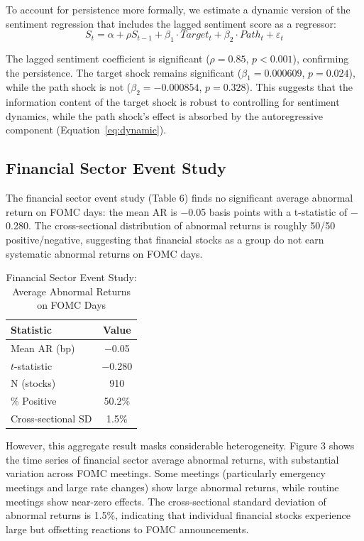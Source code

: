 \documentclass[12pt]{article}
\begin{document}
To account for persistence more formally, we estimate a dynamic version of the sentiment regression that includes the lagged sentiment score as a regressor:
\begin{equation}
\label{eq:dynamic}
S_t = \alpha + \rho S_{t-1} + \beta_1 \cdot Target_t + \beta_2 \cdot Path_t + \varepsilon_t
\end{equation}

The lagged sentiment coefficient is significant ($\rho = 0.85$, $p < 0.001$), confirming the persistence. The target shock remains significant ($\beta_1 = 0.000609$, $p = 0.024$), while the path shock is not ($\beta_2 = -0.000854$, $p = 0.328$). This suggests that the information content of the target shock is robust to controlling for sentiment dynamics, while the path shock's effect is absorbed by the autoregressive component (Equation~\eqref{eq:dynamic}).

\subsection{Financial Sector Event Study}

The financial sector event study (Table 6) finds no significant average abnormal return on FOMC days: the mean AR is $-$0.05 basis points with a t-statistic of $-$0.280. The cross-sectional distribution of abnormal returns is roughly 50/50 positive/negative, suggesting that financial stocks as a group do not earn systematic abnormal returns on FOMC days.


\begin{table}[htbp]\centering\caption{Financial Sector Event Study: Average Abnormal Returns on FOMC Days}\label{tab:event}
\begin{tabular}{lc}\toprule
Statistic & Value \\\midrule
Mean AR (bp) & $-$0.05 \\
$t$-statistic & $-$0.280 \\
N (stocks) & 910 \\
\% Positive & 50.2\% \\
Cross-sectional SD & 1.5\% \\\bottomrule\end{tabular}
\par\vspace{2pt}{\footnotesize Abnormal returns computed relative to CRSP value-weighted market return. Sample: 2020--2024 FOMC meetings.}\end{table}


However, this aggregate result masks considerable heterogeneity. Figure 3 shows the time series of financial sector average abnormal returns, with substantial variation across FOMC meetings. Some meetings (particularly emergency meetings and large rate changes) show large abnormal returns, while routine meetings show near-zero effects. The cross-sectional standard deviation of abnormal returns is 1.5\%, indicating that individual financial stocks experience large but offsetting reactions to FOMC announcements.
\end{document}
